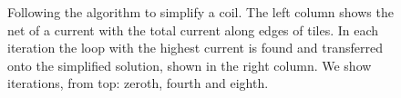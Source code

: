 \begin{figure}
  \centering
  \quad
  \caption{Following the algorithm to simplify a coil. The left column shows the net of a current with the total current along edges of tiles. In each iteration the loop with the highest current is found and transferred onto the simplified solution, shown in the right column. We show iterations, from top: zeroth, fourth and eighth.}
  \label{fig:prototype_compensation_time}
\end{figure}


